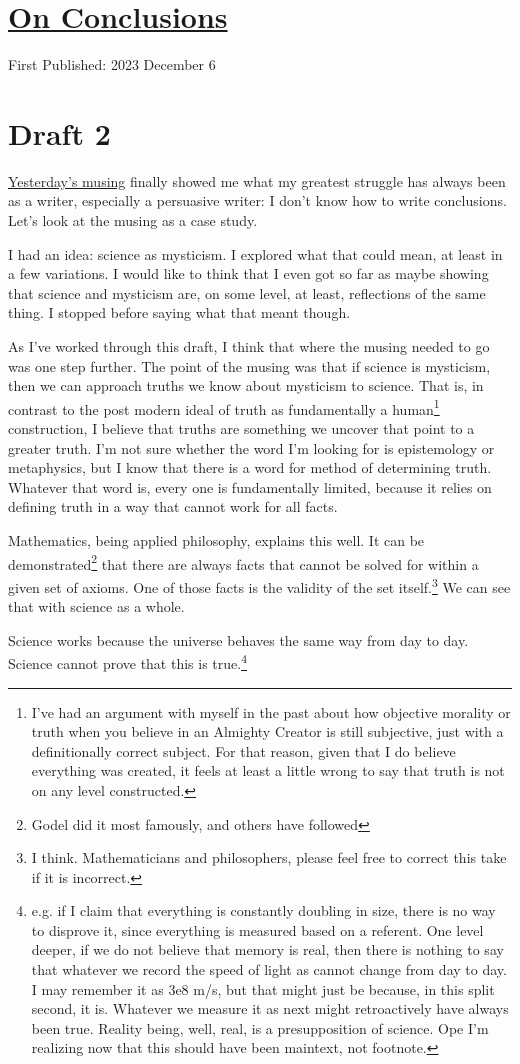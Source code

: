\documentclass[12pt]{article}[titlepage]
\newcommand{\1}{\={a}}
\newcommand{\2}{\={e}}
\newcommand{\3}{\={\i}}
\newcommand{\4}{\=o}
\newcommand{\5}{\=u}
\newcommand{\6}{\={A}}
\renewcommand{\,}{\textsuperscript{,}}
\begin{document}
\doublespacing
\section{\href{conclusions.html}{On Conclusions}}
First Published: 2023 December 6
\section{Draft 2}
\href{science-mysticism.html}{Yesterday's musing} finally showed me what my greatest struggle has always been as a writer, especially a persuasive writer: I don't know how to write conclusions.
Let's look at the musing as a case study.

I had an idea: science as mysticism.
I explored what that could mean, at least in a few variations.
I would like to think that I even got so far as maybe showing that science and mysticism are, on some level, at least, reflections of the same thing.
I stopped before saying what that meant though.

As I've worked through this draft, I think that where the musing needed to go was one step further.
The point of the musing was that if science is mysticism, then we can approach truths we know about mysticism to science.
That is, in contrast to the post modern ideal of truth as fundamentally a human\footnote{I've had an argument with myself in the past about how objective morality or truth when you believe in an Almighty Creator is still subjective, just with a definitionally correct subject. For that reason, given that I do believe everything was created, it feels at least a little wrong to say that truth is not on any level constructed.} construction, I believe that truths are something we uncover that point to a greater truth.
I'm not sure whether the word I'm looking for is epistemology or metaphysics, but I know that there is a word for method of determining truth.
Whatever that word is, every one is fundamentally limited, because it relies on defining truth in a way that cannot work for all facts.

Mathematics, being applied philosophy, explains this well.
It can be demonstrated\footnote{Godel did it most famously, and others have followed} that there are always facts that cannot be solved for within a given set of axioms.
One of those facts is the validity of the set itself.\footnote{I think. Mathematicians and philosophers, please feel free to correct this take if it is incorrect.}
We can see that with science as a whole.

Science works because the universe behaves the same way from day to day.
Science cannot prove that this is true.\footnote{e.g. if I claim that everything is constantly doubling in size, there is no way to disprove it, since everything is measured based on a referent.
One level deeper, if we do not believe that memory is real, then there is nothing to say that whatever we record the speed of light as cannot change from day to day. I may remember it as 3e8 m/s, but that might just be because, in this split second, it is.
Whatever we measure it as next might retroactively have always been true.
Reality being, well, real, is a presupposition of science.
Ope I'm realizing now that this should have been maintext, not footnote.}
\end{document}
